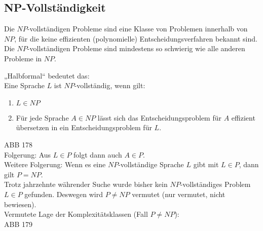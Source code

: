 \subsection{NP-Vollständigkeit}
Die $NP$-vollständigen Probleme sind eine Klasse von Problemen innerhalb von $NP$, für die keine effizienten (polynomielle) Entscheidungsverfahren bekannt sind. Die $NP$-vollständigen Probleme sind mindestens so schwierig wie alle anderen Probleme in $NP$.

„Halbformal“ bedeutet das:\\
Eine Sprache $L$ ist $NP$-vollständig, wenn gilt:
\begin{enumerate}
\item $L \in NP$
\item Für jede Sprache $A\in NP $ lässt sich das Entscheidungsproblem für $A$ effizient übersetzen in ein Entscheidungsproblem für $L$.
\end{enumerate}
ABB 178\\
Folgerung: Aus $L\in P$ folgt dann auch $A \in P$.\medskip\\
Weitere Folgerung: Wenn es eine $NP$-vollständige Sprache $L$ gibt mit $L\in P$, dann gilt $P=NP$.\medskip\\
Trotz jahrzehnte währender Suche wurde bisher kein $NP$-vollständiges Problem $L\in P$ gefunden. Deswegen wird $P\not = NP$ vermutet (nur vermutet, nicht bewiesen).\\
Vermutete Lage der Komplexitätsklassen (Fall $P \not = NP$):\\
ABB 179

